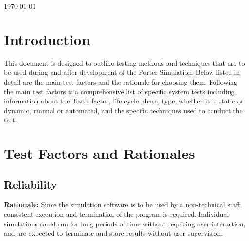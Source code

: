 \documentclass[paper=letter, fontsize=10pt]{scrartcl}
\numberwithin{equation}{section}		%
\numberwithin{figure}{section}			%
\numberwithin{table}{section}				%
\begin{document}
\begin{titlepage}
\begin{center}


{\large \today}\\[3cm] %


 

\vfill %
\end{center}
\end{titlepage}

\setcounter{tocdepth}{2}

\tableofcontents

\newpage
\section{Introduction}
This document is designed to outline testing methods and techniques that are to be used during and after development
of the Porter Simulation. Below listed in detail are the main test factors and the rationale for choosing them. 
Following the main test factors is a comprehensive list of specific system tests including information about the Test's factor, life cycle phase, type, whether it is static or dynamic, manual or automated, and the specific techniques used to
conduct the test.
\section{Test Factors and Rationales}
\subsection{Reliability}
\textbf{Rationale:} Since the simulation software is to be used by a non-technical staff, consistent execution and termination of the program is required. Individual simulations could run for long periods of time without requiring user interaction, and are expected to terminate and store results without user supervision.
\end{document}

